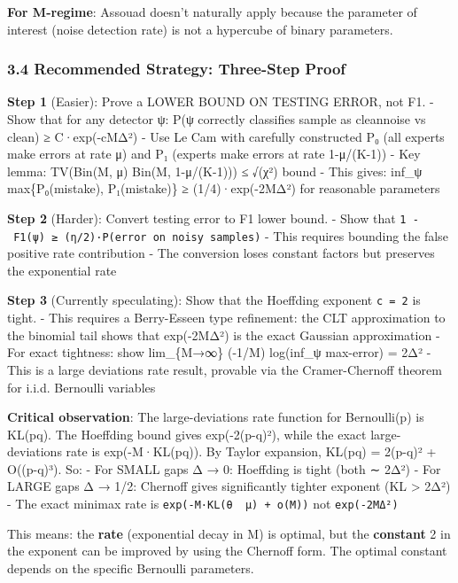 \documentclass[
  12pt,
]{ctexart}
\begin{document}
\textbf{For M-regime}: Assouad doesn't naturally apply because the
parameter of interest (noise detection rate) is not a hypercube of
binary parameters.

\subsubsection{3.4 Recommended Strategy: Three-Step
Proof}\label{recommended-strategy-three-step-proof}

\textbf{Step 1} (Easier): Prove a LOWER BOUND ON TESTING ERROR, not F1.
- Show that for any detector ψ: P(ψ correctly classifies sample as
clean\textbar noise vs clean) ≥ C·exp(-cMΔ²) - Use Le Cam with carefully
constructed P₀ (all experts make errors at rate μ) and P₁ (experts make
errors at rate 1-μ/(K-1)) - Key lemma: TV(Bin(M, μ) \textbar\textbar{}
Bin(M, 1-μ/(K-1))) ≤ √(χ²) bound - This gives: inf\_ψ max\{P₀(mistake),
P₁(mistake)\} ≥ (1/4)·exp(-2MΔ²) for reasonable parameters

\textbf{Step 2} (Harder): Convert testing error to F1 lower bound. -
Show that \texttt{1\ -\ F1(ψ)\ ≥\ (η/2)·P(error\ on\ noisy\ samples)} -
This requires bounding the false positive rate contribution - The
conversion loses constant factors but preserves the exponential rate

\textbf{Step 3} (Currently speculating): Show that the Hoeffding
exponent \texttt{c\ =\ 2} is tight. - This requires a Berry-Esseen type
refinement: the CLT approximation to the binomial tail shows that
exp(-2MΔ²) is the exact Gaussian approximation - For exact tightness:
show lim\_\{M→∞\} (-1/M) log(inf\_ψ max-error) = 2Δ² - This is a large
deviations rate result, provable via the Cramer-Chernoff theorem for
i.i.d. Bernoulli variables

\textbf{Critical observation}: The large-deviations rate function for
Bernoulli(p) is KL(p\textbar\textbar q). The Hoeffding bound gives
exp(-2(p-q)²), while the exact large-deviations rate is
exp(-M·KL(p\textbar\textbar q)). By Taylor expansion,
KL(p\textbar\textbar q) = 2(p-q)² + O((p-q)³). So: - For SMALL gaps Δ →
0: Hoeffding is tight (both ∼ 2Δ²) - For LARGE gaps Δ → 1/2: Chernoff
gives significantly tighter exponent (KL \textgreater{} 2Δ²) - The exact
minimax rate is \texttt{exp(-M·KL(θ\ \textbar{}\textbar{}\ μ)\ +\ o(M))}
not \texttt{exp(-2MΔ²)}

This means: the \textbf{rate} (exponential decay in M) is optimal, but
the \textbf{constant} 2 in the exponent can be improved by using the
Chernoff form. The optimal constant depends on the specific Bernoulli
parameters.
\end{document}
